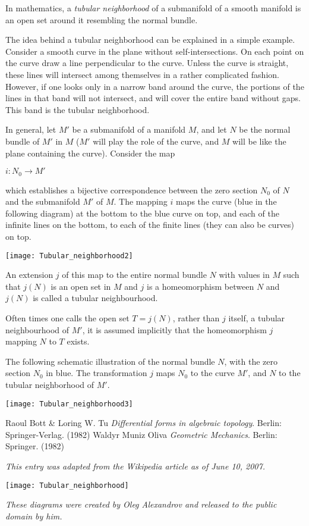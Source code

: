 \documentclass[12pt]{article}
\begin{document}
In mathematics, a {\em tubular neighborhood} of a submanifold of a smooth manifold is an open set around it resembling the normal bundle.

The idea behind a tubular neighborhood can be explained in a simple example. Consider a smooth curve in the plane without self-intersections. On each point on the curve draw a line perpendicular to the curve. Unless the curve is straight, these lines will intersect among themselves in a rather complicated fashion. However, if one looks only in a narrow band around the curve, the portions of the lines in that band will not intersect, and will cover the entire band without gaps. This band is the tubular neighborhood.

In general, let $M'$ be a submanifold of a manifold $M$, and let $N$ be the normal bundle of $M'$ in $M$ ($M'$ will play the role of the curve, and $M$ will be like the plane containing the curve). Consider the map

$i : N_0 \to M'$
 
which establishes a bijective correspondence between the zero section $N_0$ of $N$ and the submanifold $M'$ of $M$. The mapping $i$ maps the curve (blue in the following diagram) at the bottom to the blue curve on top, and each of the infinite lines on the bottom, to each of the finite lines (they can also be curves) on top.

\begin{center}
\texttt{[image: Tubular\_neighborhood2]}
\end{center}

An extension $j$ of this map to the entire normal bundle $N$ with values in $M$ such that $j(N)$ is an open set in $M$ and $j$ is a homeomorphism between $N$ and $j(N)$ is called a tubular neighbourhood.

Often times one calls the open set $T = j(N)$, rather than $j$ itself, a tubular neighbourhood of $M'$, it is assumed implicitly that the homeomorphism $j$ mapping $N$ to $T$ exists.

The following schematic illustration of the normal bundle $N$, with the zero section $N_0$ in blue. The transformation $j$ maps $N_0$ to the curve $M'$, and $N$ to the tubular neighborhood of $M'$.

\begin{center}
\texttt{[image: Tubular\_neighborhood3]}
\end{center}

\begin{thebibliography}{2}
 Raoul Bott \& Loring W. Tu {\it Differential forms in algebraic topology}. Berlin: Springer-Verlag. (1982)  
 Waldyr Muniz Oliva {\it Geometric Mechanics}. Berlin: Springer. (1982)
\end{thebibliography}

{\it This entry was adapted from the Wikipedia article  as of June 10, 2007.}

\begin{center}
\texttt{[image: Tubular\_neighborhood]}
\end{center}

{\it These diagrams were created by Oleg Alexandrov and released to the public domain by him.}
\end{document}
